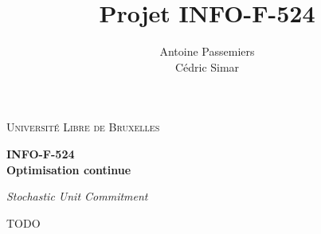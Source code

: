 \documentclass[a4paper,11pt]{report}
\title{Projet INFO-F-524}
\author{
	Antoine Passemiers \\
	Cédric Simar
}
\makeatletter
\renewcommand\bibname{Références}
\renewcommand{\refname}{Références}
\renewcommand\@biblabel[1]{#1.  }
\makeatother
\begin{document}
\renewcommand\bibname{References}
\renewcommand{\refname}{References}
\makeatletter
\renewcommand\@biblabel[1]{#1.  }
\makeatother

\begin{titlepage}
	\centering
	{\scshape\LARGE Université Libre de Bruxelles\par}
	\vfill
	{\LARGE\bfseries INFO-F-524 \\ Optimisation continue \par
		\vspace{3ex}}
	{\itshape\Large Stochastic Unit Commitment \par}
	\vfill
	\makeatletter
	{\large \@author\par}
	\vfill
	\@date\par
	\makeatother
\end{titlepage}

\tableofcontents

\setlength\parskip{0.5ex plus1ex minus.5ex}


\newpage









TODO
\citep{Papavasiliou12couplingrenewable}
\citep{Papavasiliou2013}
\citep{mitchell2011pulp}
\citep{behnel2010cython}

\newpage



\end{document}
